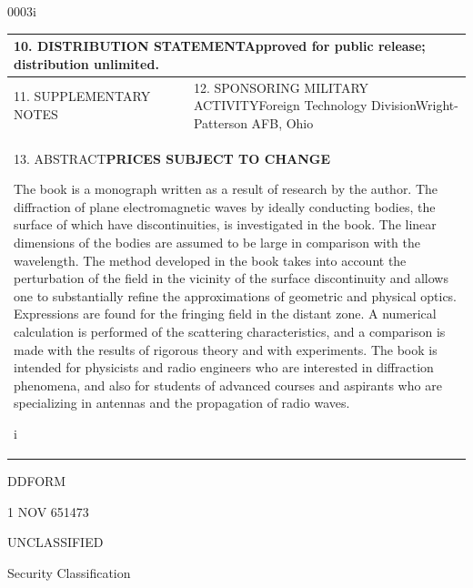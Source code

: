 \begin{scanpage}{0003}{i}
\begin{tabular}{|p{.60\linewidth}|p{.32\linewidth}|}
\multicolumn{2}{|p{.95\linewidth}|}{\footnotesize 10. DISTRIBUTION STATEMENT\newline\normalsize Approved for public release; distribution unlimited.}\\\hline
\footnotesize 11. SUPPLEMENTARY NOTES&\footnotesize 12. SPONSORING MILITARY ACTIVITY\newline\normalsize Foreign Technology Division\newline Wright-Patterson AFB, Ohio\\\hline
\multicolumn{2}{|p{.95\linewidth}|}{\footnotesize 13. ABSTRACT\newline\normalsize\centering\textbf{PRICES SUBJECT TO CHANGE}\par\raggedright
The book is a monograph written as a result of research by the author. The diffraction of plane electromagnetic waves by ideally conducting bodies, the surface of which have discontinuities, is investigated in the book. The linear dimensions of the bodies are assumed to be large in comparison with the wavelength. The method developed in the book takes into account the perturbation of the field in the vicinity of the surface discontinuity and allows one to substantially refine the approximations of geometric and physical optics. Expressions are found for the fringing field in the distant zone. A numerical calculation is performed of the scattering characteristics, and a comparison is made with the results of rigorous theory and with experiments. The book is intended for physicists and radio engineers who are interested in diffraction phenomena, and also for students of advanced courses and aspirants who are specializing in antennas and the propagation of radio waves.\par\centering i}\\\hline
\end{tabular}
\noindent DD\quad\scriptsize FORM\par 1 NOV 65\quad\Large 1473\par\normalsize\begin{center}UNCLASSIFIED\par\small Security Classification\end{center}
\end{scanpage}
